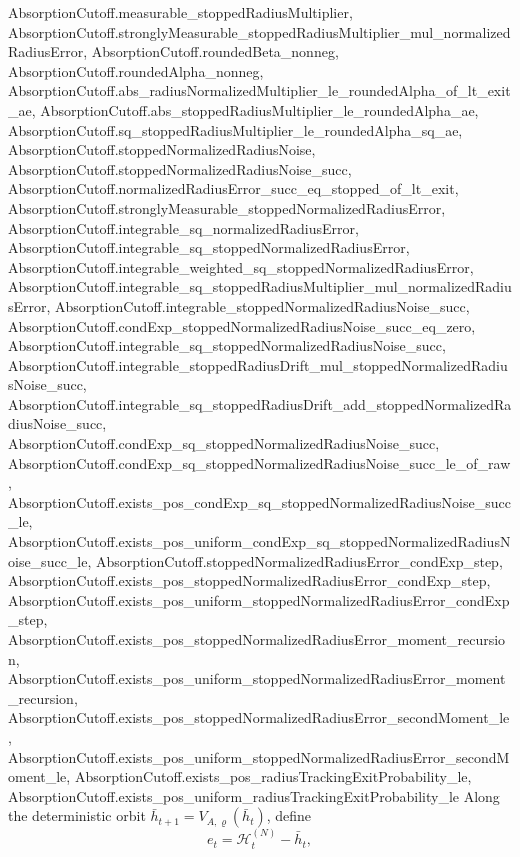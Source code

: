 \begin{lemma}
{    AbsorptionCutoff.measurable_stoppedRadiusMultiplier,
    AbsorptionCutoff.stronglyMeasurable_stoppedRadiusMultiplier_mul_normalizedRadiusError,
    AbsorptionCutoff.roundedBeta_nonneg, AbsorptionCutoff.roundedAlpha_nonneg,
    AbsorptionCutoff.abs_radiusNormalizedMultiplier_le_roundedAlpha_of_lt_exit_ae,
    AbsorptionCutoff.abs_stoppedRadiusMultiplier_le_roundedAlpha_ae,
    AbsorptionCutoff.sq_stoppedRadiusMultiplier_le_roundedAlpha_sq_ae,
    AbsorptionCutoff.stoppedNormalizedRadiusNoise,
    AbsorptionCutoff.stoppedNormalizedRadiusNoise_succ,
    AbsorptionCutoff.normalizedRadiusError_succ_eq_stopped_of_lt_exit,
    AbsorptionCutoff.stronglyMeasurable_stoppedNormalizedRadiusError,
    AbsorptionCutoff.integrable_sq_normalizedRadiusError,
    AbsorptionCutoff.integrable_sq_stoppedNormalizedRadiusError,
    AbsorptionCutoff.integrable_weighted_sq_stoppedNormalizedRadiusError,
    AbsorptionCutoff.integrable_sq_stoppedRadiusMultiplier_mul_normalizedRadiusError,
    AbsorptionCutoff.integrable_stoppedNormalizedRadiusNoise_succ,
    AbsorptionCutoff.condExp_stoppedNormalizedRadiusNoise_succ_eq_zero,
    AbsorptionCutoff.integrable_sq_stoppedNormalizedRadiusNoise_succ,
    AbsorptionCutoff.integrable_stoppedRadiusDrift_mul_stoppedNormalizedRadiusNoise_succ,
    AbsorptionCutoff.integrable_sq_stoppedRadiusDrift_add_stoppedNormalizedRadiusNoise_succ,
    AbsorptionCutoff.condExp_sq_stoppedNormalizedRadiusNoise_succ,
    AbsorptionCutoff.condExp_sq_stoppedNormalizedRadiusNoise_succ_le_of_raw,
    AbsorptionCutoff.exists_pos_condExp_sq_stoppedNormalizedRadiusNoise_succ_le,
    AbsorptionCutoff.exists_pos_uniform_condExp_sq_stoppedNormalizedRadiusNoise_succ_le,
    AbsorptionCutoff.stoppedNormalizedRadiusError_condExp_step,
    AbsorptionCutoff.exists_pos_stoppedNormalizedRadiusError_condExp_step,
    AbsorptionCutoff.exists_pos_uniform_stoppedNormalizedRadiusError_condExp_step,
    AbsorptionCutoff.exists_pos_stoppedNormalizedRadiusError_moment_recursion,
    AbsorptionCutoff.exists_pos_uniform_stoppedNormalizedRadiusError_moment_recursion,
    AbsorptionCutoff.exists_pos_stoppedNormalizedRadiusError_secondMoment_le,
    AbsorptionCutoff.exists_pos_uniform_stoppedNormalizedRadiusError_secondMoment_le,
    AbsorptionCutoff.exists_pos_radiusTrackingExitProbability_le,
    AbsorptionCutoff.exists_pos_uniform_radiusTrackingExitProbability_le}
  \leanok
  Along the deterministic orbit
  $\bar h_{t+1}=V_{A,\varrho}(\bar h_t)$, define
  \[
    e_t=\mathscr H_t^{(N)}-\bar h_t,
\]
\end{lemma}
